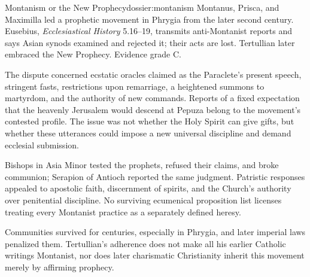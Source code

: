 \begin{heresydossier}{Montanism or the New Prophecy}{dossier:montanism}
\objectfield Montanus, Prisca, and Maximilla led a prophetic movement in Phrygia from the later second century. Eusebius, \emph{Ecclesiastical History} 5.16--19, transmits anti-Montanist reports and says Asian synods examined and rejected it; their acts are lost. Tertullian later embraced the New Prophecy. Evidence grade C.

\propositionfield The dispute concerned ecstatic oracles claimed as the Paraclete's present speech, stringent fasts, restrictions upon remarriage, a heightened summons to martyrdom, and the authority of new commands. Reports of a fixed expectation that the heavenly Jerusalem would descend at Pepuza belong to the movement's contested profile. The issue was not whether the Holy Spirit can give gifts, but whether these utterances could impose a new universal discipline and demand ecclesial submission.

\responsefield Bishops in Asia Minor tested the prophets, refused their claims, and broke communion; Serapion of Antioch reported the same judgment. Patristic responses appealed to apostolic faith, discernment of spirits, and the Church's authority over penitential discipline. No surviving ecumenical proposition list licenses treating every Montanist practice as a separately defined heresy.

\aftermathfield Communities survived for centuries, especially in Phrygia, and later imperial laws penalized them. Tertullian's adherence does not make all his earlier Catholic writings Montanist, nor does later charismatic Christianity inherit this movement merely by affirming prophecy.
\end{heresydossier}

